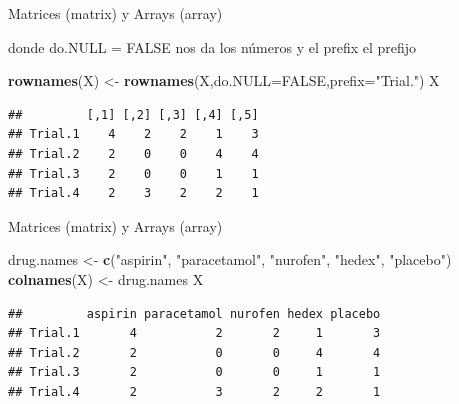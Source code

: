 \documentclass[ignorenonframetext,]{beamer}
\newenvironment{Shaded}{\begin{snugshade}}{\end{snugshade}}
\newcommand{\KeywordTok}[1]{\textcolor[rgb]{0.13,0.29,0.53}{\textbf{#1}}}
\newcommand{\DataTypeTok}[1]{\textcolor[rgb]{0.13,0.29,0.53}{#1}}
\newcommand{\StringTok}[1]{\textcolor[rgb]{0.31,0.60,0.02}{#1}}
\newcommand{\OtherTok}[1]{\textcolor[rgb]{0.56,0.35,0.01}{#1}}
\newcommand{\NormalTok}[1]{#1}
\begin{document}
\begin{frame}[fragile]{Matrices (matrix) y Arrays (array)}

donde do.NULL = FALSE nos da los números y el prefix el prefijo

\begin{Shaded}
\begin{Highlighting}[]
\KeywordTok{rownames}\NormalTok{(X) <-}\StringTok{ }\KeywordTok{rownames}\NormalTok{(X,}\DataTypeTok{do.NULL=}\OtherTok{FALSE}\NormalTok{,}\DataTypeTok{prefix=}\StringTok{"Trial."}\NormalTok{)}
\NormalTok{X}
\end{Highlighting}
\end{Shaded}

\begin{verbatim}
##         [,1] [,2] [,3] [,4] [,5]
## Trial.1    4    2    2    1    3
## Trial.2    2    0    0    4    4
## Trial.3    2    0    0    1    1
## Trial.4    2    3    2    2    1
\end{verbatim}

\end{frame}

\begin{frame}[fragile]{Matrices (matrix) y Arrays (array)}

\begin{Shaded}
\begin{Highlighting}[]
\NormalTok{drug.names <-}\StringTok{ }\KeywordTok{c}\NormalTok{(}\StringTok{"aspirin"}\NormalTok{, }\StringTok{"paracetamol"}\NormalTok{, }\StringTok{"nurofen"}\NormalTok{,}
                \StringTok{"hedex"}\NormalTok{, }\StringTok{"placebo"}\NormalTok{)}
\KeywordTok{colnames}\NormalTok{(X) <-}\StringTok{ }\NormalTok{drug.names}
\NormalTok{X}
\end{Highlighting}
\end{Shaded}

\begin{verbatim}
##         aspirin paracetamol nurofen hedex placebo
## Trial.1       4           2       2     1       3
## Trial.2       2           0       0     4       4
## Trial.3       2           0       0     1       1
## Trial.4       2           3       2     2       1
\end{verbatim}

\end{frame}
\end{document}

